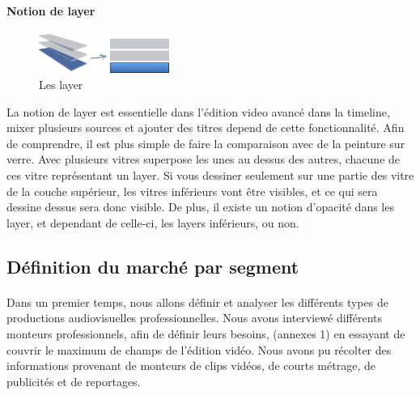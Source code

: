 \paragraph{Notion de layer}
  \begin{figure}
    \begin{center}
      \vspace{-20pt}
      \includegraphics[width=0.38\textwidth]{images/layers}
    \end{center}
    \vspace{-20pt}
    \caption{Les layer}
    \label{Yes}
  \end{figure}
  La notion de layer est essentielle dans l'édition video avancé dans la
  timeline, mixer plusieurs sources et ajouter des titres depend de cette
  fonctionnalité. Afin de comprendre, il est plus simple de faire la comparaison
  avec de la peinture sur verre. Avec plusieurs vitres superpose les unes au
  dessus des autres, chacune de ces vitre représentant un layer. Si vous
  dessiner seulement sur une partie des vitre de la couche supérieur, les vitres
  inférieurs vont être visibles, et ce qui sera dessine dessus sera donc visible.
  De plus, il existe un notion d'opacité dans les layer, et dependant de celle-ci,
  les layers inférieurs, ou non.

\subsection{Définition du marché par segment}
\paragraph{}
Dans un premier temps, nous allons définir et analyser les
différents types de productions audiovisuelles professionnelles.
Nous avons interviewé
différents monteurs professionnels, afin de définir leurs besoins,
(annexes 1) en essayant de
couvrir le maximum de champs de l'édition vidéo. Nous
avons pu récolter des informations provenant de monteurs de clips
vidéos, de courts métrage, de publicités et de reportages.

